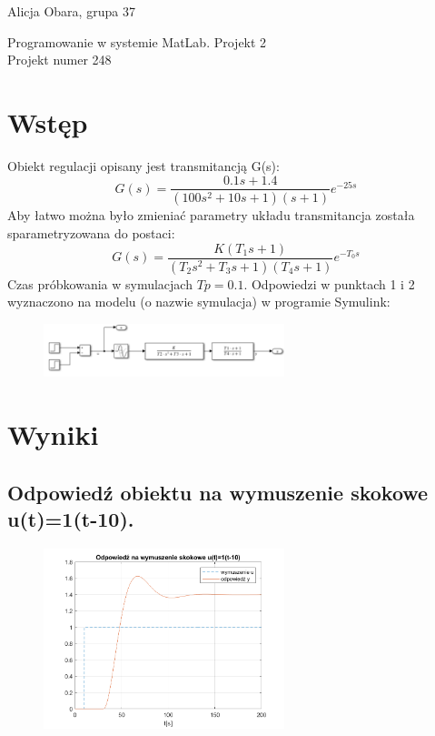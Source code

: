 \documentclass[a4paper]{article}
\begin{document}
	
\pagestyle{plain}
{\raggedright Alicja Obara, grupa 37 \\}
{\centering \Large Programowanie w systemie MatLab. Projekt 2\\Projekt numer 248 \\}
\renewcommand{\thesection}{\Roman{section}}
\section{Wstęp}
Obiekt regulacji opisany jest transmitancją G(s):
$$G(s)=\frac{0.1s+1.4}{(100s^2 +10s+1)(s+1)} e^{-25s}$$
Aby łatwo można było zmieniać parametry układu transmitancja została sparametryzowana do postaci:
$$G(s)=\frac{K (T_1 s+1)}{(T_2 s^2 +T_3 s+1)(T_4 s+1)} e^{-T_0 s}$$
Czas próbkowania w symulacjach $Tp=0.1$.
Odpowiedzi w punktach 1 i 2 wyznaczono na modelu (o nazwie symulacja) w programie Symulink:
\begin{figure}[H]
	\centering
	\includegraphics[width=7cm]{modelsymulacja} 
\end{figure}

\section{Wyniki}

\renewcommand{\thesubsection}{\arabic{subsection}}

\subsection{Odpowiedź obiektu na wymuszenie skokowe u(t)=1(t-10).}
\begin{figure}[H]
	\centering
	\includegraphics[width=7cm]{pkt1} 
\end{figure}
\end{document}
